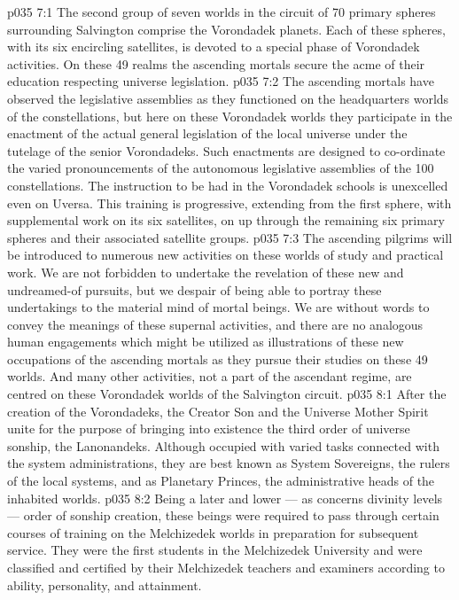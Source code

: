\vs p035 7:1 The second group of seven worlds in the circuit of 70 primary spheres surrounding Salvington comprise the Vorondadek planets. Each of these spheres, with its six encircling satellites, is devoted to a special phase of Vorondadek activities. On these 49 realms the ascending mortals secure the acme of their education respecting universe legislation.
\vs p035 7:2 The ascending mortals have observed the legislative assemblies as they functioned on the headquarters worlds of the constellations, but here on these Vorondadek worlds they participate in the enactment of the actual general legislation of the local universe under the tutelage of the senior Vorondadeks. Such enactments are designed to co\hyp{}ordinate the varied pronouncements of the autonomous legislative assemblies of the 100 constellations. The instruction to be had in the Vorondadek schools is unexcelled even on Uversa. This training is progressive, extending from the first sphere, with supplemental work on its six satellites, on up through the remaining six primary spheres and their associated satellite groups.
\vs p035 7:3 The ascending pilgrims will be introduced to numerous new activities on these worlds of study and practical work. We are not forbidden to undertake the revelation of these new and undreamed\hyp{}of pursuits, but we despair of being able to portray these undertakings to the material mind of mortal beings. We are without words to convey the meanings of these supernal activities, and there are no analogous human engagements which might be utilized as illustrations of these new occupations of the ascending mortals as they pursue their studies on these 49 worlds. And many other activities, not a part of the ascendant regime, are centred on these Vorondadek worlds of the Salvington circuit.
\vs p035 8:1 After the creation of the Vorondadeks, the Creator Son and the Universe Mother Spirit unite for the purpose of bringing into existence the third order of universe sonship, the Lanonandeks. Although occupied with varied tasks connected with the system administrations, they are best known as System Sovereigns, the rulers of the local systems, and as Planetary Princes, the administrative heads of the inhabited worlds.
\vs p035 8:2 Being a later and lower --- as concerns divinity levels --- order of sonship creation, these beings were required to pass through certain courses of training on the Melchizedek worlds in preparation for subsequent service. They were the first students in the Melchizedek University and were classified and certified by their Melchizedek teachers and examiners according to ability, personality, and attainment.
